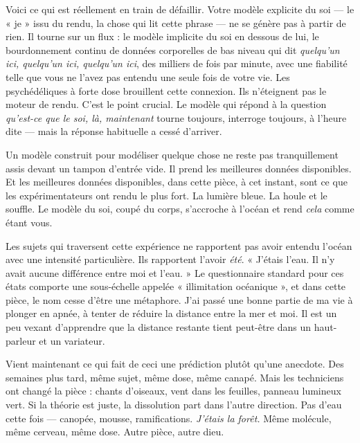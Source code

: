 \documentclass[11pt, twoside, openright]{book}
\begin{document}
Voici ce qui est réellement en train de défaillir. Votre modèle explicite du soi --- le « je » issu du rendu, la chose qui lit cette phrase --- ne se génère pas à partir de rien. Il tourne sur un flux : le modèle implicite du soi en dessous de lui, le bourdonnement continu de données corporelles de bas niveau qui dit \textit{quelqu'un ici, quelqu'un ici, quelqu'un ici}, des milliers de fois par minute, avec une fiabilité telle que vous ne l'avez pas entendu une seule fois de votre vie. Les psychédéliques à forte dose brouillent cette connexion. Ils n'éteignent pas le moteur de rendu. C'est le point crucial. Le modèle qui répond à la question \textit{qu'est-ce que le soi, là, maintenant} tourne toujours, interroge toujours, à l'heure dite --- mais la réponse habituelle a cessé d'arriver.

Un modèle construit pour modéliser quelque chose ne reste pas tranquillement assis devant un tampon d'entrée vide. Il prend les meilleures données disponibles. Et les meilleures données disponibles, dans cette pièce, à cet instant, sont ce que les expérimentateurs ont rendu le plus fort. La lumière bleue. La houle et le souffle. Le modèle du soi, coupé du corps, s'accroche à l'océan et rend \textit{cela} comme étant vous.

Les sujets qui traversent cette expérience ne rapportent pas avoir entendu l'océan avec une intensité particulière. Ils rapportent l'avoir \textit{été}. « J'étais l'eau. Il n'y avait aucune différence entre moi et l'eau. » Le questionnaire standard pour ces états comporte une sous-échelle appelée « illimitation océanique », et dans cette pièce, le nom cesse d'être une métaphore. J'ai passé une bonne partie de ma vie à plonger en apnée, à tenter de réduire la distance entre la mer et moi. Il est un peu vexant d'apprendre que la distance restante tient peut-être dans un haut-parleur et un variateur.

Vient maintenant ce qui fait de ceci une prédiction plutôt qu'une anecdote. Des semaines plus tard, même sujet, même dose, même canapé. Mais les techniciens ont changé la pièce : chants d'oiseaux, vent dans les feuilles, panneau lumineux vert. Si la théorie est juste, la dissolution part dans l'autre direction. Pas d'eau cette fois --- canopée, mousse, ramifications. \textit{J'étais la forêt.} Même molécule, même cerveau, même dose. Autre pièce, autre dieu.
\end{document}
